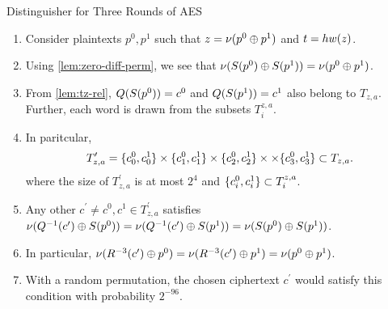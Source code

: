 \documentclass[notheorems]{beamer}
\theoremstyle{definition}
\theoremstyle{example}
\begin{document}
    \begin{frame}{Distinguisher for Three Rounds of AES}
        \begin{enumerate}
            \item<1-> Consider plaintexts \(p^0, p^1\) such that \(z =
            \nu(p^0 \oplus p^1)\) and \(t = hw(z)\). 
            \item<2-> Using \cref{lem:zero-diff-perm}, we see that
            \(\nu(S(p^0) \oplus S(p^1)) = \nu(p^0 \oplus
            p^1)\). 
            \item<3-> From \cref{lem:tz-rel}, \(Q(S(p^0)) = c^0\) and
            \(Q(S(p^1)) = c^1\) also belong to \(T_{z, a}\). Further,
            each word is drawn from the subsets \(T_i^{z, a}\). 
            \item<4-> In paritcular,
            \begin{equation}
                T_{z, a}^\prime = \{c_0^0, c_0^1\} \times \{c_1^0, c_1^1\} \times \{c_2^0, c_2^1\} \times \times \{c_3^0, c_3^1\} \subset T_{z, a}.
            \end{equation}
            where the size of \(T_{z, a}^\prime\) is at most \(2^4\) and \(\{c_i^0,
            c_i^1\} \subset T_i^{z, a}\). 
            \item<5-> Any other \(c^\prime \ne c^0, c^1 \in T_{z, a}^\prime\)
            satisfies \(\nu(Q^{-1}(c^\prime) \oplus S(p^0)) =
            \nu(Q^{-1}(c^\prime) \oplus S(p^1)) =
            \nu(S(p^0) \oplus S(p^1))\). 
            \item<6-> In particular, \(\nu(R^{-3}(c^\prime) \oplus
            p^0) = \nu(R^{-3}(c^\prime) \oplus p^1) = \nu(p^0
            \oplus p^1)\). 
            \item<7-> With a random permutation, the chosen ciphertext
            \(c^\prime\) would satisfy this condition with probability
            \(2^{-96}\).
        \end{enumerate}        
    \end{frame}
\end{document}
